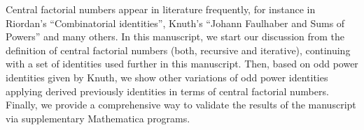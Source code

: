 Central factorial numbers appear in literature frequently, for instance in Riordan's ``Combinatorial identities'',
Knuth's ``Johann Faulhaber and Sums of Powers'' and many others.
In this manuscript, we start our discussion from the definition of central factorial numbers (both, recursive and iterative),
continuing with a set of identities used further in this manuscript.
Then, based on odd power identities given by Knuth,
we show other variations of odd power identities applying derived previously identities in terms of central factorial numbers.
Finally,
we provide a comprehensive way to validate the results of the manuscript via supplementary Mathematica programs.
